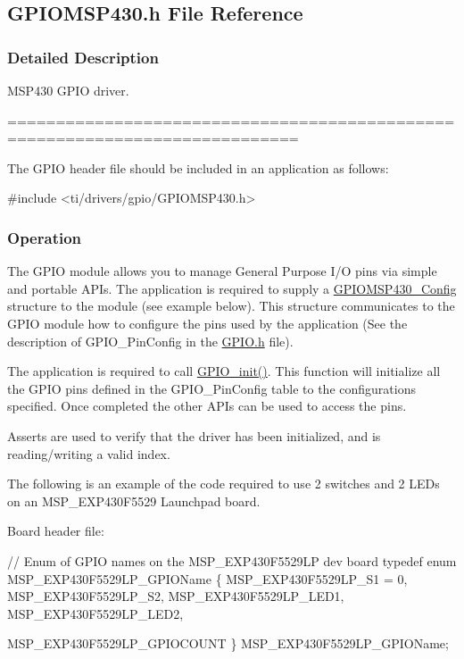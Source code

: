 \subsection{G\+P\+I\+O\+M\+S\+P430.\+h File Reference}
\label{_g_p_i_o_m_s_p430_8h}


\subsubsection{Detailed Description}
M\+S\+P430 G\+P\+I\+O driver. 

============================================================================

The G\+P\+I\+O header file should be included in an application as follows\+: 
\begin{DoxyCode}
\textcolor{preprocessor}{#include <ti/drivers/gpio/GPIOMSP430.h>}
\end{DoxyCode}


\subsubsection*{Operation}

The G\+P\+I\+O module allows you to manage General Purpose I/\+O pins via simple and portable A\+P\+Is. The application is required to supply a \hyperlink{struct_g_p_i_o_m_s_p430___config}{G\+P\+I\+O\+M\+S\+P430\+\_\+\+Config} structure to the module (see example below). This structure communicates to the G\+P\+I\+O module how to configure the pins used by the application (See the description of G\+P\+I\+O\+\_\+\+Pin\+Config in the \hyperlink{_g_p_i_o_8h}{G\+P\+I\+O.\+h} file).

The application is required to call \hyperlink{_g_p_i_o_8h_a7aaec489dca5ac4d278d2eb3ae38a2d2}{G\+P\+I\+O\+\_\+init()}. This function will initialize all the G\+P\+I\+O pins defined in the G\+P\+I\+O\+\_\+\+Pin\+Config table to the configurations specified. Once completed the other A\+P\+Is can be used to access the pins.

Asserts are used to verify that the driver has been initialized, and is reading/writing a valid index.

The following is an example of the code required to use 2 switches and 2 L\+E\+Ds on an M\+S\+P\+\_\+\+E\+X\+P430\+F5529 Launchpad board.

Board header file\+: 
\begin{DoxyCode}
\textcolor{comment}{// Enum of GPIO names on the MSP\_EXP430F5529LP dev board}
\textcolor{keyword}{typedef} \textcolor{keyword}{enum} MSP\_EXP430F5529LP\_GPIOName \{
    MSP\_EXP430F5529LP\_S1 = 0,
    MSP\_EXP430F5529LP\_S2,
    MSP\_EXP430F5529LP\_LED1,
    MSP\_EXP430F5529LP\_LED2,

    MSP\_EXP430F5529LP\_GPIOCOUNT
\} MSP\_EXP430F5529LP\_GPIOName;
\end{DoxyCode}


